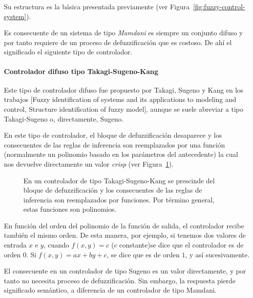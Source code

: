 Su estructura es la básica presentada previamente (ver Figura~\ref{fig:fuzzy-control-system}).

Es consecuente de un sistema de tipo \textit{Mamdani} es siempre un conjunto difuso y por tanto requiere de un proceso de defuzzificación que es costoso. De ahí el significado el siguiente tipo de controlador.

\paragraph{Controlador difuso tipo Takagi-Sugeno-Kang}

Este tipo de controlador difuso fue propuesto por Takagi, Sugeno y Kang en los trabajos [Fuzzy identification of systems and its applications to modeling and control, Structure identification of fuzzy model], aunque se suele abreviar a tipo Takagi-Sugeno o, directamente, Sugeno.

En este tipo de controlador, el bloque de defuzzificación desaparece y los consecuentes de las reglas de inferencia son reemplazados por una función (normalmente un polinomio basado en los parámetros del antecedente) la cual nos devuelve directamente un valor \textit{crisp} (ver Figura~\ref{fig:sugeno-type}).

\begin{figure}
	\centering
	\caption[Ejemplo de reglas en controlador Takagi-Sugeno]{En un controlador de tipo Takagi-Sugeno-Kang se prescinde del bloque de defuzzificación y los consecuentes de las reglas de inferencia son reemplazados por funciones. Por término general, estas funciones son polinomios.}
	\label{fig:sugeno-type}
\end{figure}

En función del orden del polinomio de la función de salida, el controlador recibe también el mismo orden. De esta manera, por ejemplo, si tenemos dos valores de entrada $x$ e $y$, cuando $f(x, y) = c$ ($c$ constante)se dice que el controlador es de orden $0$. Si $f(x, y) = ax + by + c$, se dice que es de orden $1$, y así sucesivamente.

El consecuente en un controlador de tipo Sugeno es un valor directamente, y por tanto no necesita proceso de defuzzificación. Sin embargo, la respuesta pierde significado semántico, a diferencia de un controlador de tipo Mamdani.

